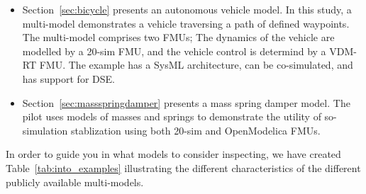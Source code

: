 \begin{itemize}
  \item Section~\ref{sec:bicycle} presents an autonomous vehicle model. In this study, a multi-model demonstrates a vehicle traversing a path of defined waypoints. The multi-model comprises two FMUs; The dynamics of the vehicle are modelled by a 20-sim FMU, and the vehicle control is determind by a VDM-RT FMU. The example has a SysML architecture, can be co-simulated, and has support for DSE.
  \item Section~\ref{sec:massspringdamper} presents a mass spring damper model. The pilot uses models of masses and springs to demonstrate the utility of so-simulation stablization using both 20-sim and OpenModelica FMUs.
 
  
\end{itemize}

In order to guide you in what models to consider inspecting, we have created Table~\ref{tab:into_examples} illustrating the different characteristics of the different publicly available multi-models. 

